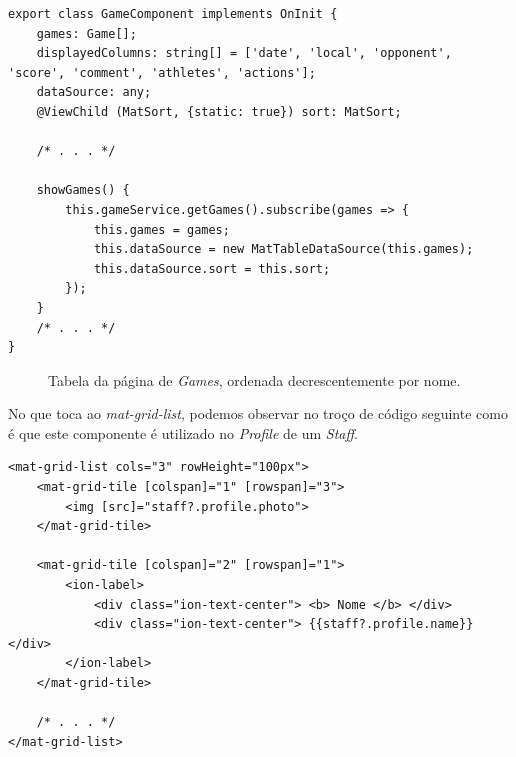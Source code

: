 \begin{lstlisting}
export class GameComponent implements OnInit {
	games: Game[];
	displayedColumns: string[] = ['date', 'local', 'opponent', 'score', 'comment', 'athletes', 'actions'];
	dataSource: any;
	@ViewChild (MatSort, {static: true}) sort: MatSort;

	/* . . . */

	showGames() {
		this.gameService.getGames().subscribe(games => {
			this.games = games;
			this.dataSource = new MatTableDataSource(this.games);
			this.dataSource.sort = this.sort;
		});
	}
	/* . . . */
}
\end{lstlisting}

\begin{figure}[h]
	\begin{center}
	\end{center}
	\caption{Tabela da página de \textit{Games}, ordenada decrescentemente por nome.}\label{fig:gamessortednameup}
\end{figure}



No que toca ao \textit{mat-grid-list}, podemos observar no troço de código seguinte como é que este componente é utilizado no \textit{Profile} de um \textit{Staff}.
\\

\begin{lstlisting}
<mat-grid-list cols="3" rowHeight="100px">
	<mat-grid-tile [colspan]="1" [rowspan]="3">
		<img [src]="staff?.profile.photo">
	</mat-grid-tile>
	
	<mat-grid-tile [colspan]="2" [rowspan]="1">
		<ion-label>
			<div class="ion-text-center"> <b> Nome </b> </div>
			<div class="ion-text-center"> {{staff?.profile.name}} </div>
		</ion-label>
	</mat-grid-tile>
	
	/* . . . */
</mat-grid-list>

\end{lstlisting}

